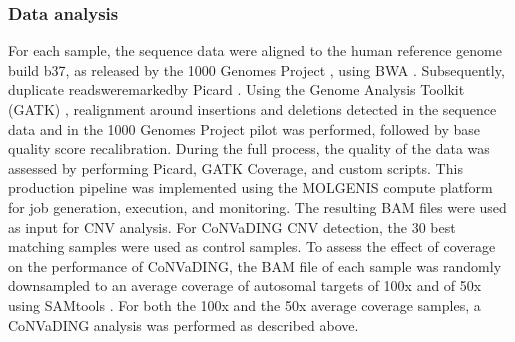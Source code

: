 \subsubsection{Data analysis}
For each sample, the sequence data were aligned to the human reference genome build b37, as released by the 1000 Genomes Project \cite{Durbin_2010}, using BWA \cite{Li_2010}. 
Subsequently, duplicate readsweremarkedby Picard \cite{Picard_nd}. 
Using the Genome Analysis Toolkit (GATK) \cite{McKenna_2010}, realignment around insertions and deletions detected in the sequence data and in the 1000 Genomes Project pilot \cite{Durbin_2010} was performed, followed by base quality score recalibration. 
During the full process, the quality of the data was assessed by performing Picard, GATK Coverage, and custom scripts. This production pipeline was implemented using the MOLGENIS compute \cite{Byelas_2013} platform for job generation, execution, and monitoring. 
The resulting BAM files were used as input for CNV analysis. 
For CoNVaDING CNV detection, the 30 best matching samples were used as control samples. 
To assess the effect of coverage on the performance of CoNVaDING, the BAM file of each sample was randomly downsampled to an average coverage of autosomal targets of 100x and of 50x using SAMtools \cite{Li_2009}. 
For both the 100x and the 50x average coverage samples, a CoNVaDING analysis was performed as described above.

